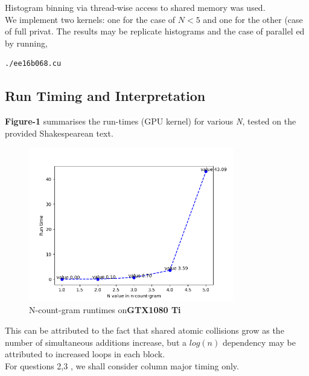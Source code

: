 Histogram binning via thread-wise access to shared memory was used. \\

We implement two kernels: one for the case of $N <5$ and one for the other (case of full privat. The results may be replicate histograms and the case of parallel ed by running,

\begin{lstlisting}[numbers = none]
./ee16b068.cu
\end{lstlisting}

\subsection{Run Timing and Interpretation}

\textbf{Figure-1} summarises the run-times (GPU kernel) for various \textit{N}, tested on the provided Shakespearean text.

\begin{figure}[ht]
\centering
\includegraphics[angle=0,width=0.8\textwidth]{q1.png}
\caption{N-count-gram runtimes on\textbf{GTX1080 Ti}}
\end{figure}

This can be attributed to the fact that shared atomic collisions grow as the number of simultaneous additions increase, but a $log(n)$ dependency may be attributed to increased loops in each block. \\

For questions 2,3 , we shall consider column major timing only. \\

